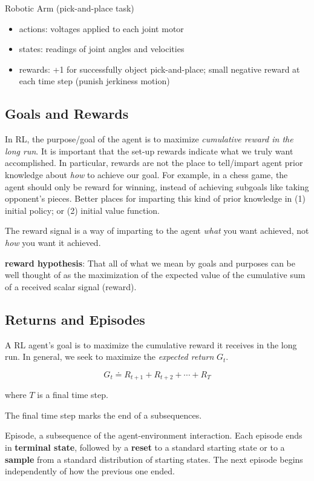 \documentclass[sutton_barto_notes.tex]{subfiles}
\begin{document}
\begin{example}
Robotic Arm (pick-and-place task)

\begin{itemize}
\item actions: voltages applied to each joint motor
\item states: readings of joint angles and velocities
\item rewards: +1 for successfully object pick-and-place; small negative reward at each time step (punish jerkiness motion)
\end{itemize}
\end{example}


\subsection{Goals and Rewards}
 In RL, the purpose/goal of the agent is to maximize \textit{cumulative reward in the long run}.
 It is important that the set-up rewards indicate what we truly want accomplished.
 In particular, rewards are not the place to tell/impart agent prior knowledge about \textit{how} to achieve our goal.
 For example, in a chess game, the agent should only be reward for winning, instead of achieving subgoals like taking opponent's pieces.
 Better places for imparting this kind of prior knowledge in (1) initial policy; or (2) initial value function.
 
The reward signal is a way of imparting to the agent \textit{what} you want achieved, not \textit{how} you want it achieved.

\textbf{reward hypothesis}: That all of what we mean by goals and purposes can be well thought of as the maximization of the expected value of the cumulative sum of a received scalar signal (reward).

\subsection{Returns and Episodes}

A RL agent's goal is to maximize the cumulative reward it receives in the long run.
In general, we seek to maximize the \textit{expected return} $G_t$.

$$ G_t \doteq R_{t+1} + R_{t+2} + \cdots + R_T $$

where $T$ is a final time step.

The final time step marks the end of a subsequences.

\begin{definition}
Episode, a subsequence of the agent-environment interaction. Each episode ends in \textbf{terminal state}, followed by a \textbf{reset} to a standard starting state or to a \textbf{sample} from a standard distribution of starting states. The next episode begins independently of how the previous one ended.
\end{definition}
\end{document}
